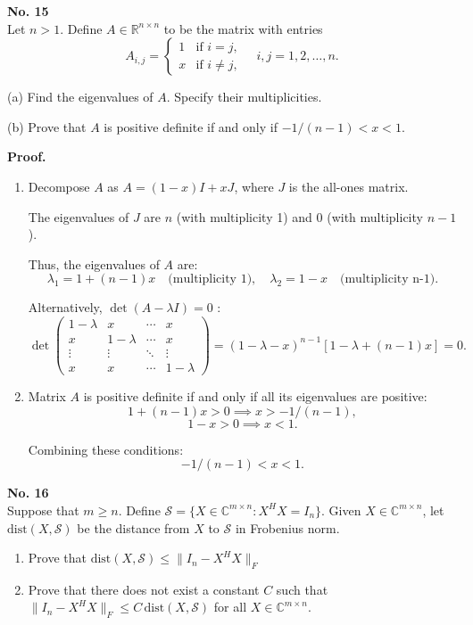 \documentclass[a4paper, 11pt]{article}
\newenvironment{problem}[2][No.]
    { \begin{mdframed}[backgroundcolor=gray!5] \textbf{#1 #2} \\}
    {  \end{mdframed}}
\newenvironment{solution}
    {\textbf{Proof.}}
    {}
\begin{document}
\begin{problem}{15}
	Let \( n > 1 \). Define \( A \in \mathbb{R}^{n \times n} \) to be the matrix with entries
$$
	A_{i,j} = 
	\begin{cases} 
		1 & \text{if } i = j, \\
		x & \text{if } i \neq j, 
	\end{cases}
	\quad i,j = 1,2,\ldots,n.
$$
	
	(a) Find the eigenvalues of \( A \). Specify their multiplicities.
	
	\vspace{1em}
	
	(b) Prove that \( A \) is positive definite if and only if \( -1/(n - 1) < x < 1 \).
\end{problem}

\begin{solution}
    \begin{enumerate}
	\item[(a)]
	Decompose \( A \) as \( A = (1 - x)I + xJ \), where \( J \) is the all-ones matrix. 
	
	The eigenvalues of \( J \) are \( n \) (with multiplicity 1) and \( 0 \) (with multiplicity \( n-1 \)). 
	
	Thus, the eigenvalues of \( A \) are:
	$$
	\lambda_1 = 1 + (n-1)x \quad \text{(multiplicity 1)}, \quad \lambda_2 = 1 - x \quad \text{(multiplicity n-1)}.
	$$
	
	Alternatively, \( \det(A - \lambda I) = 0 \) :
	$$
	\det\begin{pmatrix}
		1-\lambda & x & \cdots & x \\
		x & 1-\lambda & \cdots & x \\
		\vdots & \vdots & \ddots & \vdots \\
		x & x & \cdots & 1-\lambda
	\end{pmatrix} = (1 - \lambda - x)^{n-1} [1 - \lambda + (n-1)x] = 0.
$$
	
	\item[(b)]
	Matrix \( A \) is positive definite if and only if all its eigenvalues are positive:
	 $$ 1 + (n-1)x > 0 \implies x > -1/(n-1) ,$$
	$$ 1 - x > 0 \implies x < 1 .$$
	
	Combining these conditions:
	$$
	-1/(n-1) < x < 1.
	$$
	 \end{enumerate}
\end{solution}

\begin{problem}{16}
	Suppose that \( m \geq n \). Define \( \mathcal{S} = \{ X \in \mathbb{C}^{m \times n} : X^H X = I_n \} \). Given \( X \in \mathbb{C}^{m \times n} \), let \( \text{dist}(X, \mathcal{S}) \) be the distance from \( X \) to \( \mathcal{S} \) in Frobenius norm.
	\begin{enumerate}
		\item[(a)] Prove that \( \text{dist}(X, \mathcal{S}) \leq \| I_n - X^H X \|_F \)
		\item[(b)] Prove that there does not exist a constant \( C \) such that \( \| I_n - X^H X \|_F \leq C \, \text{dist}(X, \mathcal{S}) \) for all \( X \in \mathbb{C}^{m \times n} \).
	\end{enumerate}
\end{problem}
\end{document}
